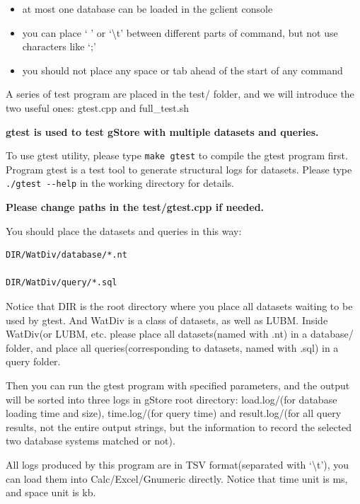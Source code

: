 \documentclass[titlepage, a4paper, 12pt]{article}
\begin{document}
\begin{itemize}
\item
  at most one database can be loaded in the gclient console
\item
  you can place ` ' or `\textbackslash{}t' between different parts of
  command, but not use characters like `;'
\item
  you should not place any space or tab ahead of the start of any
  command
\end{itemize}


A series of test program are placed in the test/ folder, and we will
introduce the two useful ones: gtest.cpp and full\_test.sh

\textbf{gtest is used to test gStore with multiple datasets and
queries.}

To use gtest utility, please type \texttt{make\ gtest} to compile the
gtest program first. Program gtest is a test tool to generate structural
logs for datasets. Please type \texttt{./gtest\ -\/-help} in the working
directory for details.

\textbf{Please change paths in the test/gtest.cpp if needed.}

You should place the datasets and queries in this way:

\begin{verbatim}
DIR/WatDiv/database/*.nt

DIR/WatDiv/query/*.sql
\end{verbatim}

Notice that DIR is the root directory where you place all datasets
waiting to be used by gtest. And WatDiv is a class of datasets, as well
as LUBM. Inside WatDiv(or LUBM, etc. please place all datasets(named
with .nt) in a database/ folder, and place all queries(corresponding to
datasets, named with .sql) in a query folder.

Then you can run the gtest program with specified parameters, and the
output will be sorted into three logs in gStore root directory:
load.log/(for database loading time and size), time.log/(for query time)
and result.log/(for all query results, not the entire output strings,
but the information to record the selected two database systems matched
or not).

All logs produced by this program are in TSV format(separated with
`\textbackslash{}t'), you can load them into Calc/Excel/Gnumeric
directly. Notice that time unit is ms, and space unit is kb.
\end{document}
